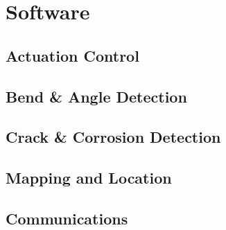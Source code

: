 \documentclass[11pt]{article}		%
\begin{document}
	\section{Software}
	
		\subsection{Actuation Control}
		
		\subsection{Bend \& Angle Detection}
		
		\subsection{Crack \& Corrosion Detection}
		
		\subsection{Mapping and Location}
		
		\subsection{Communications}
	
	\pagebreak		%
	
	\begingroup 
	\onehalfspacing
	{\small
		
		
	}
	\endgroup
	\thispagestyle{empty} %
\end{document}
